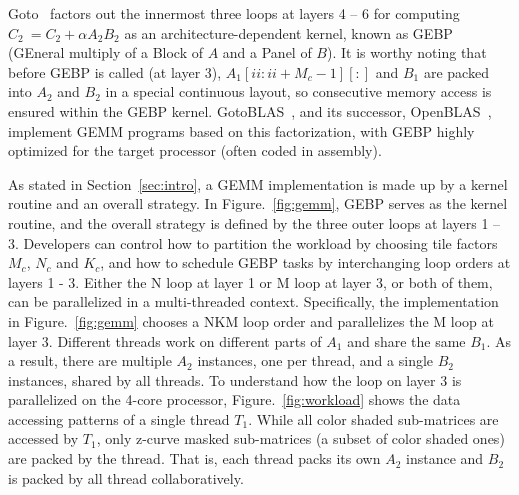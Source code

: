 Goto~\cite{gotogemm} factors out the innermost three loops at layers 4 -- 6 for
computing $C_2\ = C_2 + \alpha A_2 B_2$ as an architecture-dependent kernel,
known as  GEBP (GEneral multiply of a Block of $A$ and a Panel of $B$).
It is worthy noting that before GEBP is called (at layer 3),
$A_1[ii:ii+M_c-1][:]$ and $B_1$ are packed into $A_2$ and $B_2$
in a special continuous layout,
so consecutive memory access is ensured within the GEBP kernel.
GotoBLAS~\cite{gotoblas}, and its successor, OpenBLAS~\cite{openblas},
implement GEMM programs based on this factorization,
with GEBP highly optimized for the target processor (often coded in assembly).

As stated in Section~\ref{sec:intro}, a GEMM implementation
is made up by a kernel routine and an overall strategy.
In Figure.~\ref{fig:gemm}, GEBP serves as the kernel routine,
and the overall strategy is defined by the three outer loops at layers 1 -- 3.
Developers can control how to partition the workload by choosing
tile factors $M_c$, $N_c$ and $K_c$,
and how to schedule GEBP tasks by interchanging loop orders at layers 1 - 3.
Either the N loop at layer 1 or M loop at layer 3, or both of them,
can be parallelized in a multi-threaded context.
Specifically, the implementation in Figure.~\ref{fig:gemm}
chooses a NKM loop order and parallelizes the M loop at layer 3.
Different threads work on different parts of $A_1$
and share the same $B_1$.
As a result, there are multiple $A_2$ instances, one per thread,
and a single $B_2$ instances, shared by all threads.
To understand how the loop on layer 3 is parallelized on the 4-core processor, 
Figure.~\ref{fig:workload} shows the data accessing patterns of a single thread $T_1$.
While all color shaded sub-matrices are accessed by $T_1$,
only z-curve masked sub-matrices (a subset of color shaded ones)
are packed by the thread.
That is, each thread packs its own $A_2$ instance and 
$B_2$ is packed by all thread collaboratively.

